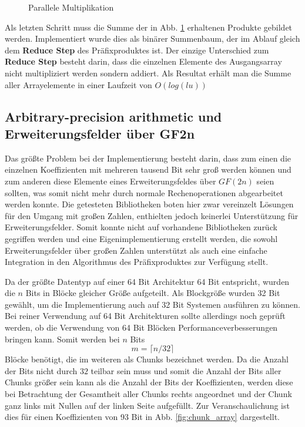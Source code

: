 \begin{figure}
\centering

\caption{Parallele Multiplikation} \label{fig:parallel_multiplication}
\end{figure}

Als letzten Schritt muss die Summe der in Abb. \ref{fig:parallel_multiplication} erhaltenen Produkte gebildet werden. Implementiert wurde dies als binärer Summenbaum, der im Ablauf gleich dem \textbf{Reduce Step} des Präfixproduktes ist. Der einzige Unterschied zum \textbf{Reduce Step} besteht darin, dass die einzelnen Elemente des Ausgangsarray nicht multipliziert werden sondern addiert. Als Resultat erhält man die Summe aller Arrayelemente in einer Laufzeit von $O(log(lu))$

\subsection{Arbitrary-precision arithmetic und Erweiterungsfelder über GF2n}
Das größte Problem bei der Implementierung besteht darin, dass zum einen die einzelnen Koeffizienten mit mehreren tausend Bit sehr groß werden können und zum anderen diese Elemente eines Erweiterungsfeldes über $GF(2n)$ seien sollten, was somit nicht mehr durch normale Rechenoperationen abgearbeitet werden konnte. Die getesteten Bibliotheken boten hier zwar vereinzelt Lösungen für den Umgang mit großen Zahlen, enthielten jedoch keinerlei Unterstützung für Erweiterungsfelder. Somit konnte nicht auf vorhandene Bibliotheken zurück gegriffen werden und eine Eigenimplementierung erstellt werden, die sowohl Erweiterungsfelder über großen Zahlen unterstützt als auch eine einfache Integration in den Algorithmus des Präfixproduktes zur Verfügung stellt.\newline

Da der größte Datentyp auf einer 64 Bit Architektur 64 Bit entspricht, wurden die $n$ Bits in Blöcke gleicher Größe aufgeteilt. Als Blockgröße wurden 32 Bit gewählt, um die Implementierung auch auf 32 Bit Systemen ausführen zu können. Bei reiner Verwendung auf 64 Bit Architekturen sollte allerdings noch geprüft werden, ob die Verwendung von 64 Bit Blöcken Performanceverbesserungen bringen kann. Somit werden bei $n$ Bits $$m = \lceil n/32 \rceil$$ Blöcke benötigt, die im weiteren als Chunks bezeichnet werden. Da die Anzahl der Bits nicht durch $32$ teilbar sein muss und somit die Anzahl der Bits aller Chunks größer sein kann als die Anzahl der Bits der Koeffizienten, werden diese bei Betrachtung der Gesamtheit aller Chunks rechts angeordnet und der Chunk ganz links mit Nullen auf der linken Seite aufgefüllt. Zur Veranschaulichung ist dies für einen Koeffizienten von 93 Bit in Abb. \ref{fig:chunk_array} dargestellt.\newline

